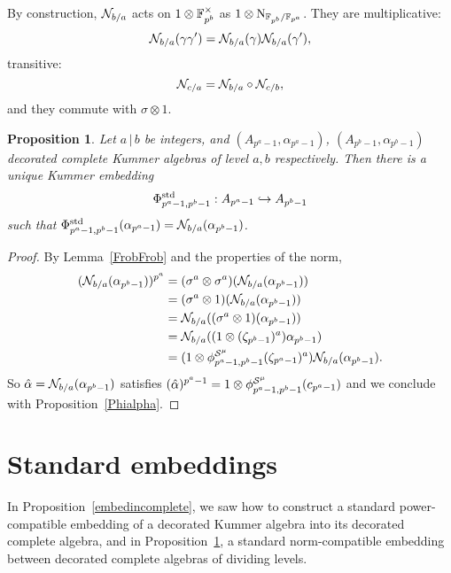 \documentclass{sig-alternate}
\newtheorem{proposition}[theorem]{Proposition}
\begin{document}
By construction, $\mathcal{N}_{b/a}$ acts on $1\otimes\mathbb{F}_{p^b}^\times$ as $1\otimes\operatorname{N}_{\mathbb{F}_{p^b}/\mathbb{F}_{p^a}}$.
They are multiplicative:
\[
  \mathcal{N}_{b/a}(\gamma\gamma')=\mathcal{N}_{b/a}(\gamma)\mathcal{N}_{b/a}(\gamma'),
\]
transitive: \[ \mathcal{N}_{c/a} = \mathcal{N}_{b/a}\circ\mathcal{N}_{c/b},\] and they
commute with $\sigma\otimes1$.
\begin{proposition}
\label{embedcomplete}
Let $a\,|\,b$ be integers,
and $(A_{p^a-1},\alpha_{p^a-1})$, $(A_{p^b-1},\alpha_{p^b-1})$ decorated complete Kummer algebras
of level $a,b$ respectively.
Then there is a unique Kummer embedding
\[ {\Phi^{\textrm{std}}_{{p^a-1},{p^b-1}}}:A_{p^a-1}\hookrightarrow A_{p^b-1} \]
such that ${\Phi^{\textrm{std}}_{{p^a-1},{p^b-1}}}(\alpha_{p^a-1})=\mathcal{N}_{b/a}(\alpha_{p^b-1})$.
\end{proposition}
\begin{proof}
By Lemma~\ref{FrobFrob} and the properties of the norm,
\begin{equation*}
\begin{split}
(\mathcal{N}_{b/a}(\alpha_{p^b-1}))^{p^a}&=(\sigma^a\otimes\sigma^a)(\mathcal{N}_{b/a}(\alpha_{p^b-1}))\\
&=(\sigma^a\otimes1)(\mathcal{N}_{b/a}(\alpha_{p^b-1}))\\
&=\mathcal{N}_{b/a}((\sigma^a\otimes1)(\alpha_{p^b-1}))\\
&=\mathcal{N}_{b/a}((1\otimes(\zeta_{p^b-1})^a)\alpha_{p^b-1})\\
&=(1\otimes{\phi^{\mathcal{S}^\mu}_{{p^a-1},{p^b-1}}}(\zeta_{p^a-1})^a)\mathcal{N}_{b/a}(\alpha_{p^b-1}).
\end{split}
\end{equation*}
So $\hat\alpha=\mathcal{N}_{b/a}(\alpha_{p^b-1})$
satisfies $(\hat{\alpha})^{p^a-1}=1\otimes{\phi^{\mathcal{S}^\mu}_{{p^a-1},{p^b-1}}}(c_{p^a-1})$
and we conclude with Proposition~\ref{Phialpha}.
\end{proof}



\section{Standard embeddings}
\label{sec:construction}

In Proposition~\ref{embedincomplete}, we saw how to construct a standard
power-compatible embedding of a decorated Kummer algebra into
its decorated complete algebra,
and in Proposition~\ref{embedcomplete}, a standard
norm-compatible embedding between decorated complete algebras
of dividing levels.
 
\end{document}
